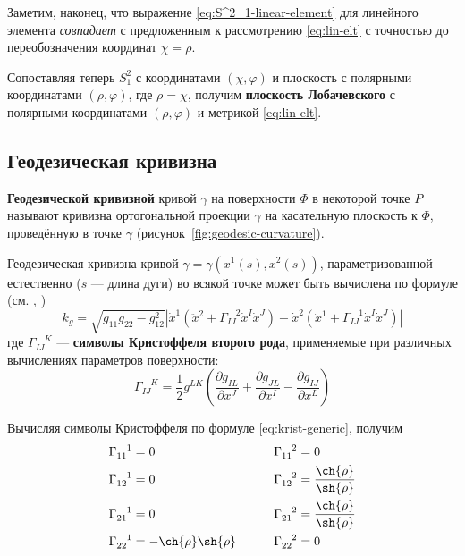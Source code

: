 \documentclass{article}
\numberwithin{equation}{section}
\renewcommand{\phi}{\varphi}
\newcommand{\krist}[3]{\Gamma^{\phantom{#1 #2}#3}_{#1 #2}}
\newcommand{\neword}[1]{\textbf{#1}}
\providecommand{\abs}[1]{\left \lvert{#1}\right \rvert}
\begin{document}
Заметим, наконец, что выражение \eqref{eq:S^2_1-linear-element} для
линейного элемента \emph{совпадает} с предложенным к рассмотрению
\eqref{eq:lin-elt} с точностью до переобозначения координат $\chi =
\rho$.

Сопоставляя теперь $S^2_1$ с координатами $(\chi, \phi)$ и плоскость с
полярными координатами $(\rho, \phi)$, где $\rho=\chi$, получим
\neword{плоскость Лобачевского} с полярными координатами $(\rho,
\phi)$ и метрикой \eqref{eq:lin-elt}.

\subsection{Геодезическая кривизна}

\neword{Геодезической кривизной} кривой $\gamma$ на поверхности $\Phi$
в некоторой точке $P$ называют кривизна ортогональной проекции
$\gamma$ на касательную плоскость к $\Phi$, проведённую в точке
$\gamma$ (рисунок \ref{fig:geodesic-curvature}).



Геодезическая кривизна кривой $\gamma = \gamma(x^1(s), x^2(s))$,
параметризованной естественно ($s$ — длина дуги) во всякой точке может
быть вычислена по формуле (см. \cite{pogorelov74}, \cite{rashevsky50})
\begin{equation}
  k_g = \sqrt{g_{11} g_{22} - g_{12}^2}\abs{\dot{x}^1 (\ddot{x}^2 +
    \krist{I}{J}{2} \dot{x}^I \dot{x}^J) - \dot{x}^2 (\ddot{x}^1 +
    \krist{I}{J}{1} \dot{x}^I \dot{x}^J)}
\end{equation}
где $\krist{I}{J}{K}$ — \neword{символы Кристоффеля второго рода},
применяемые при различных вычислениях параметров поверхности:
\begin{equation}\label{eq:krist-generic}
  \krist{I}{J}{K} = \frac{1}{2} g^{LK} \left (
    \frac{\partial{g_{IL}}}{\partial{x^J}} +
    \frac{\partial{g_{JL}}}{\partial{x^I}} -
    \frac{\partial{g_{IJ}}}{\partial{x^L}} \right )
\end{equation}

Вычисляя символы Кристоффеля по формуле \eqref{eq:krist-generic},
получим
\begin{equation}\label{eq:krist}
  \begin{aligned}
    \krist{1}{1}{1} &= 0 &\qquad \krist{1}{1}{2} &= 0 \\
    \krist{1}{2}{1} &= 0 &\qquad \krist{1}{2}{2} &= \frac{\ch{\rho}}{\sh{\rho}} \\
    \krist{2}{1}{1} &= 0 &\qquad \krist{2}{1}{2} &= \frac{\ch{\rho}}{\sh{\rho}} \\
    \krist{2}{2}{1} &= -\ch{\rho} \sh{\rho} &\qquad \krist{2}{2}{2} & = 0
  \end{aligned}
\end{equation}
\end{document}

